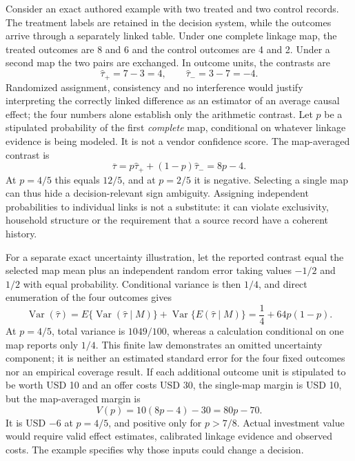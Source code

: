 Consider an exact authored example with two treated and two control records. The
treatment labels are retained in the decision system, while the outcomes arrive
through a separately linked table. Under one complete linkage map, the treated
outcomes are 8 and 6 and the control outcomes are 4 and 2. Under a second map the
two pairs are exchanged. In outcome units, the contrasts are
\begin{equation}
 \widehat\tau_{+}=7-3=4,\qquad
 \widehat\tau_{-}=3-7=-4.
 \label{exec22:obs-maps}
\end{equation}
Randomized assignment, consistency and no interference would justify interpreting
the correctly linked difference as an estimator of an average causal effect;
the four numbers alone establish only the arithmetic contrast. Let $p$ be a
stipulated probability of the first \emph{complete} map, conditional on whatever
linkage evidence is being modeled. It is not a vendor confidence score. The
map-averaged contrast is
\begin{equation}
 \overline\tau=p\widehat\tau_{+}+(1-p)\widehat\tau_{-}=8p-4.
 \label{exec22:obs-mixture}
\end{equation}
At $p=4/5$ this equals $12/5$, and at $p=2/5$ it is negative. Selecting a single
map can thus hide a decision-relevant sign ambiguity. Assigning independent
probabilities to individual links is not a substitute: it can violate exclusivity,
household structure or the requirement that a source record have a coherent
history.\cite{exec22_obs_reference}

For a separate exact uncertainty illustration, let the reported contrast equal
the selected map mean plus an independent random error taking values $-1/2$ and
$1/2$ with equal probability. Conditional variance is then $1/4$, and direct
enumeration of the four outcomes gives
\begin{equation}
 \operatorname{Var}(\widehat\tau)
 =E\{\operatorname{Var}(\widehat\tau\mid M)\}
  +\operatorname{Var}\{E(\widehat\tau\mid M)\}
 =\frac14+64p(1-p).
 \label{exec22:obs-variance}
\end{equation}
At $p=4/5$, total variance is $1049/100$, whereas a calculation conditional on one
map reports only $1/4$. This finite law demonstrates an omitted uncertainty
component; it is neither an estimated standard error for the four fixed outcomes
nor an empirical coverage result. If each additional outcome unit is stipulated
to be worth USD 10 and an offer costs USD 30, the single-map margin is USD 10,
but the map-averaged margin is
\begin{equation}
 V(p)=10(8p-4)-30=80p-70.
 \label{exec22:obs-value}
\end{equation}
It is USD $-6$ at $p=4/5$, and positive only for $p>7/8$. Actual investment value
would require valid effect estimates, calibrated linkage evidence and observed
costs. The example specifies why those inputs could change a decision.

